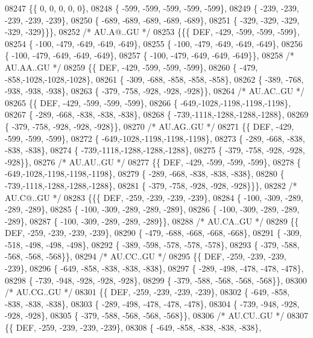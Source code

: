 \begin{DoxyCode}
08247 \{\{    0,    0,    0,    0,    0\},
08248 \{ -599, -599, -599, -599, -599\},
08249 \{ -239, -239, -239, -239, -239\},
08250 \{ -689, -689, -689, -689, -689\},
08251 \{ -329, -329, -329, -329, -329\}\}\},
08252 \textcolor{comment}{/* AU.A@..GU */}
08253 \{\{\{  DEF, -429, -599, -599, -599\},
08254 \{ -100, -479, -649, -649, -649\},
08255 \{ -100, -479, -649, -649, -649\},
08256 \{ -100, -479, -649, -649, -649\},
08257 \{ -100, -479, -649, -649, -649\}\},
08258 \textcolor{comment}{/* AU.AA..GU */}
08259 \{\{  DEF, -429, -599, -599, -599\},
08260 \{ -479, -858,-1028,-1028,-1028\},
08261 \{ -309, -688, -858, -858, -858\},
08262 \{ -389, -768, -938, -938, -938\},
08263 \{ -379, -758, -928, -928, -928\}\},
08264 \textcolor{comment}{/* AU.AC..GU */}
08265 \{\{  DEF, -429, -599, -599, -599\},
08266 \{ -649,-1028,-1198,-1198,-1198\},
08267 \{ -289, -668, -838, -838, -838\},
08268 \{ -739,-1118,-1288,-1288,-1288\},
08269 \{ -379, -758, -928, -928, -928\}\},
08270 \textcolor{comment}{/* AU.AG..GU */}
08271 \{\{  DEF, -429, -599, -599, -599\},
08272 \{ -649,-1028,-1198,-1198,-1198\},
08273 \{ -289, -668, -838, -838, -838\},
08274 \{ -739,-1118,-1288,-1288,-1288\},
08275 \{ -379, -758, -928, -928, -928\}\},
08276 \textcolor{comment}{/* AU.AU..GU */}
08277 \{\{  DEF, -429, -599, -599, -599\},
08278 \{ -649,-1028,-1198,-1198,-1198\},
08279 \{ -289, -668, -838, -838, -838\},
08280 \{ -739,-1118,-1288,-1288,-1288\},
08281 \{ -379, -758, -928, -928, -928\}\}\},
08282 \textcolor{comment}{/* AU.C@..GU */}
08283 \{\{\{  DEF, -259, -239, -239, -239\},
08284 \{ -100, -309, -289, -289, -289\},
08285 \{ -100, -309, -289, -289, -289\},
08286 \{ -100, -309, -289, -289, -289\},
08287 \{ -100, -309, -289, -289, -289\}\},
08288 \textcolor{comment}{/* AU.CA..GU */}
08289 \{\{  DEF, -259, -239, -239, -239\},
08290 \{ -479, -688, -668, -668, -668\},
08291 \{ -309, -518, -498, -498, -498\},
08292 \{ -389, -598, -578, -578, -578\},
08293 \{ -379, -588, -568, -568, -568\}\},
08294 \textcolor{comment}{/* AU.CC..GU */}
08295 \{\{  DEF, -259, -239, -239, -239\},
08296 \{ -649, -858, -838, -838, -838\},
08297 \{ -289, -498, -478, -478, -478\},
08298 \{ -739, -948, -928, -928, -928\},
08299 \{ -379, -588, -568, -568, -568\}\},
08300 \textcolor{comment}{/* AU.CG..GU */}
08301 \{\{  DEF, -259, -239, -239, -239\},
08302 \{ -649, -858, -838, -838, -838\},
08303 \{ -289, -498, -478, -478, -478\},
08304 \{ -739, -948, -928, -928, -928\},
08305 \{ -379, -588, -568, -568, -568\}\},
08306 \textcolor{comment}{/* AU.CU..GU */}
08307 \{\{  DEF, -259, -239, -239, -239\},
08308 \{ -649, -858, -838, -838, -838\},

\end{DoxyCode}
